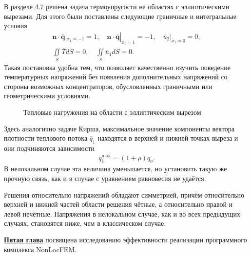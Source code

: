 \underline{В разделе 4.7} решена задача термоупругости на областях с эллиптическими вырезами. Для этого были поставлены следующие граничные и интегральные условия
\begin{gather*}
	\boldsymbol{n} \cdot \overline{\boldsymbol{q}}|_{\overline{x}_1 = -1} = 1,
	\quad
	\boldsymbol{n} \cdot \overline{\boldsymbol{q}}|_{\overline{x}_1 = 1} = -1,
	\quad
	\overline{u}_2 |_{\overline{x}_1 = 0} = 0,
	\\
	\iint\limits_S \overline{T} dS = 0,
	\quad
	\iint\limits_S \overline{u}_1 dS = 0.
\end{gather*}
Такая постановка удобна тем, что позволяет качественно изучить поведение температурных напряжений без появления дополнительных напряжений со стороны возможных концентраторов, обусловленных граничными или геометрическими условиями.

\begin{figure}[ht]
    \caption{Тепловые нагружения на области с эллиптическим вырезом}
    \label{fig:ThermalKirshProblem}
\end{figure}

Здесь аналогично задаче Кирша, максимальное значение компоненты вектора плотности теплового потока $\overline{q}_1$ находятся в верхней и нижней точках выреза и они подчиняются зависимости
\begin{gather*}
	\overline{q}_1^{\max} = (1 + \rho) q_o.
\end{gather*}
В нелокальном случае эта величина уменьшается, но установить такую же прочную связь, как и в случае с уравнением равновесия не удаётся.

Решения относительно напряжений обладают симметрией, причём относительно верхней и нижней частей области решения чётные, а относительно правой и левой нечётные. Напряжения в нелокальном случае, как и во всех предыдущих случаях, становятся ниже, чем в классическом случае.

\underline{\textbf{Пятая глава}} посвящена исследованию эффективности реализации программного комплекса NonLocFEM.

